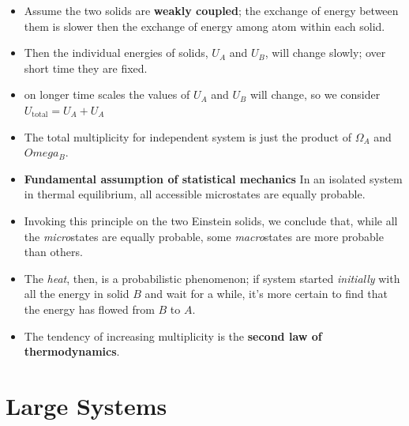 \documentclass{book}
\begin{document}
\begin{itemize}
	\item Assume the two solids are \textbf{weakly coupled}; the exchange of energy between them
	      is slower then the exchange of energy among atom within each solid.
	\item Then the individual energies of solids, $U_A$ and $U_B$, will change slowly;
	      over short time they are fixed.
	\item on longer time scales the values of $U_A$ and $U_B$ will change, so we consider
	      $U_\text{total} = U_A + U_A$
	\item The total multiplicity for independent system is just the product of $\Omega_A$ and $Omega_B$.
	\item \textbf{Fundamental assumption of statistical mechanics} In an isolated system
	      in thermal equilibrium, all accessible microstates are equally probable.
	\item Invoking this principle on the two Einstein solids, we conclude that, while all the
	      \textit{micro}states are equally probable, some \textit{macro}states are more probable than others.
	\item The \textit{heat}, then, is a probabilistic phenomenon; if system started \textit{initially}
	      with all the energy in solid $B$ and wait for a while, it's more certain to find that the
	      energy has flowed from $B$ to $A$.
	\item The tendency of increasing multiplicity is the \textbf{second law of thermodynamics}.
\end{itemize}


\section{Large Systems}%
\label{sec:large systems}
\end{document}

